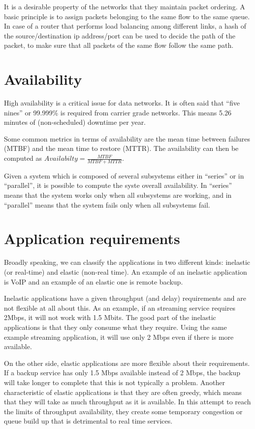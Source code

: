 It is a desirable property of the networks that they maintain packet ordering.
A basic principle is to assign packets belonging to the same flow to the same queue.
In case of a router that performs load balancing among different links, a hash of the source/destination ip address/port can be used to decide the path of the packet, to make sure that all packets of the same flow follow the same path.

\section{Availability}

High availability is a critical issue for data networks.
It is often said that ``five nines'' or 99.999\% is required from carrier grade networks.
This means 5.26 minutes of (non-scheduled) downtime per year.

Some common metrics in terms of availability are the mean time between failures (MTBF) and the mean time to restore (MTTR).
The availability can then be computed as $Availabilty = \frac{MTBF}{MTBF+MTTR}$.

Given a system which is composed of several subsystems either in ``series'' or in ``parallel'', it is possible to compute the syste overall availability.
In ``series'' means that the system works only when all subsystems are working, and in ``parallel'' means that the system fails only when all subsystems fail.

\section{Application requirements}
Broadly speaking, we can classify the applications in two different kinds: inelastic (or real-time) and elastic (non-real time).
An example of an inelastic application is VoIP and an example of an elastic one is remote backup.

Inelastic applications have a given throughput (and delay) requirements and are not flexible at all about this.
As an example, if an streaming service requires 2Mbps, it will not work with 1.5 Mbits.
The good part of the inelastic applications is that they only consume what they require.
Using the same example streaming application, it will use only 2 Mbps even if there is more available.

On the other side, elastic applications are more flexible about their requirements.
If a backup service has only 1.5 Mbps available instead of 2 Mbps, the backup will take longer to complete that this is not typically a problem.
Another characteristic of elastic applications is that they are often greedy, which means that they will take as much throughput as it is available.
In this attempt to reach the limits of throughput availability, they create some temporary congestion or queue build up that is detrimental to real time services.

